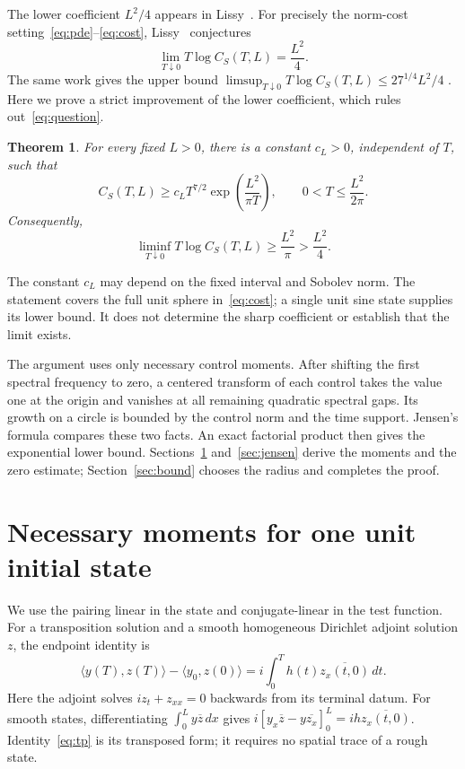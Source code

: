 \documentclass[11pt]{article}
\newtheorem{theorem}{Theorem}
\begin{document}
The lower coefficient $L^2/4$ appears in
Lissy~\cite[Theorem 1.2, equation (8)]{Lissy2015}.
For precisely the norm-cost setting~\eqref{eq:pde}--\eqref{eq:cost},
Lissy~\cite[Sections 3.1--3.2]{Lissy2025} conjectures
\begin{equation}\label{eq:question}
 \lim_{T\downarrow0}T\log C_S(T,L)=\frac{L^2}{4}.
\end{equation}
The same work gives the upper bound
$\limsup_{T\downarrow0}T\log C_S(T,L)\le 27^{1/4}L^2/4$
\cite[Theorem 3.1]{Lissy2025}. Here we prove a strict improvement of the lower
coefficient, which rules out~\eqref{eq:question}.

\begin{theorem}\label{thm:main}
For every fixed $L>0$, there is a constant $c_L>0$, independent of $T$, such
that
\begin{equation}\label{eq:main-bound}
 C_S(T,L)\ge c_L T^{7/2}\exp\!\left(\frac{L^2}{\pi T}\right),
 \qquad 0<T\le\frac{L^2}{2\pi}.
\end{equation}
Consequently,
\begin{equation}\label{eq:liminf}
 \liminf_{T\downarrow0}T\log C_S(T,L)
 \ge\frac{L^2}{\pi}>\frac{L^2}{4}.
\end{equation}
\end{theorem}

The constant $c_L$ may depend on the fixed interval and Sobolev norm. The
statement covers the full unit sphere in~\eqref{eq:cost}; a single unit sine
state supplies its lower bound. It does not determine the sharp coefficient
or establish that the limit exists.

The argument uses only necessary control moments. After shifting the first
spectral frequency to zero, a centered transform of each control takes the
value one at the origin and vanishes at all remaining quadratic spectral
gaps. Its growth on a circle is bounded by the control norm and the time
support. Jensen's formula compares these two facts. An exact factorial product
then gives the exponential lower bound. Sections~\ref{sec:moments}
and~\ref{sec:jensen} derive the moments and the zero estimate;
Section~\ref{sec:bound} chooses the radius and completes the proof.

\section{Necessary moments for one unit initial state}\label{sec:moments}
We use the pairing linear in the state and conjugate-linear in the test
function. For a transposition solution and a smooth homogeneous Dirichlet
adjoint solution $z$, the endpoint identity is
\begin{equation}\label{eq:tp}
 \langle y(T),z(T)\rangle-\langle y_0,z(0)\rangle
 =i\int_0^T h(t)\overline{z_x(t,0)}\,dt.
\end{equation}
Here the adjoint solves $iz_t+z_{xx}=0$ backwards from its terminal datum.
For smooth states, differentiating $\int_0^L y\overline z\,dx$ gives
$i[y_x\overline z-y\overline{z_x}]_0^L
=i h\overline{z_x(t,0)}$.
Identity~\eqref{eq:tp} is its transposed form; it requires no spatial trace
of a rough state.
\end{document}
